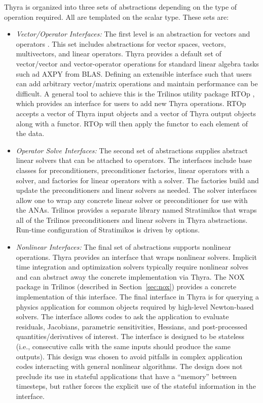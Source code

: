 Thyra is organized into three sets of abstractions depending on the type of operation required. All are templated on the scalar type. These sets are:
\begin{itemize}
\item \emph{Vector/Operator Interfaces:} The first level is an abstraction for vectors and operators \cite{Bartlett2007}. This set includes abstractions for vector spaces, vectors, multivectors, and linear operators. Thyra provides a default set of vector/vector and vector-operator operations for standard linear algebra tasks such ad AXPY from BLAS. Defining an extensible interface such that users can add arbitrary vector/matrix operations and maintain performance can be difficult. A general tool to achieve this is the Trilinos utility package RTOp \cite{rtop}, which provides an interface for users to add new Thyra operations. RTOp accepts a vector of Thyra input objects and a vector of Thyra output objects along with a functor. RTOp will then apply the functor to each element of the data.

\item \emph{Operator Solve Interfaces:} The second set of abstractions supplies abstract linear solvers that can be attached to operators. The interfaces include base classes for preconditioners, preconditioner factories, linear operators with a solver, and factories for linear operators with a solver. The factories build and update the preconditioners and linear solvers as needed. The solver interfaces allow one to wrap any concrete linear solver or preconditioner for use with the ANAs. Trilinos provides a separate library named Stratimikos that wraps all of the Trilinos preconditioners and linear solvers in Thyra abstractions. Run-time configuration of Stratimikos is driven by  options.

\item \emph{Nonlinear Interfaces:} The final set of abstractions supports nonlinear operations. Thyra provides an interface that wraps nonlinear solvers. Implicit time integration and optimization solvers typically require nonlinear solves and can abstract away the concrete implementation via Thyra. The NOX package in Trilinos (described in Section~\ref{sec:nox}) provides a concrete implementation of this interface. The final interface in Thyra is for querying a physics application for common objects required by high-level Newton-based solvers. The  interface allows codes to ask the application to evaluate residuals, Jacobians, parametric sensitivities, Hessians, and post-processed quantities/derivatives of interest. The interface is designed to be stateless (i.e., consecutive calls with the same inputs should produce the same outputs). This design was chosen to avoid pitfalls in complex application codes interacting with general nonlinear algorithms. The design does not preclude its use in stateful applications that have a ``memory'' between timesteps, but rather forces the explicit use of the stateful information in the interface.
\end{itemize}
